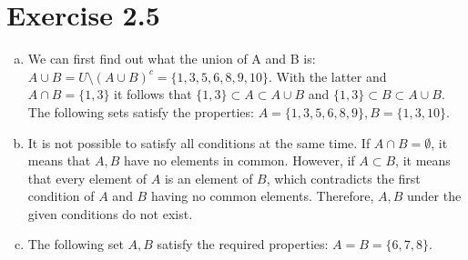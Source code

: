 \documentclass{article} %
\newcommand{\homeworkNumber}{2}
\begin{document}
\section*{Exercise \homeworkNumber.5}
\begin{enumerate}[(a)]
	\item We can first find out what the union of A and B is: \( A \cup B = U \setminus (A \cup B)^{c} = \{1, 3, 5, 6, 8, 9, 10\} \).
	      With the latter and \( A \cap B = \{1, 3\}  \) it follows that \( \{1, 3\} \subset A \subset A \cup B \)
	      and \( \{1, 3\} \subset B \subset A \cup B \).
	      The following sets satisfy the properties: \( A = \{1, 3, 5, 6, 8, 9\}, B = \{1, 3, 10\}\).
	\item It is not possible to satisfy all conditions at the same time.
	      If \( A \cap B = \emptyset \), it means that \( A, B \) have no elements in common.
	      However, if \( A \subset B \), it means that every element of \( A \) is an element of \( B \),
	      which contradicts the first condition of \( A \) and \( B \) having no common elements.
	      Therefore, \( A,B \) under the given conditions do not exist.
	\item The following set \( A, B \) satisfy the required properties:
	      \( A = B = \{6,7,8\} \).
\end{enumerate}
\end{document}
